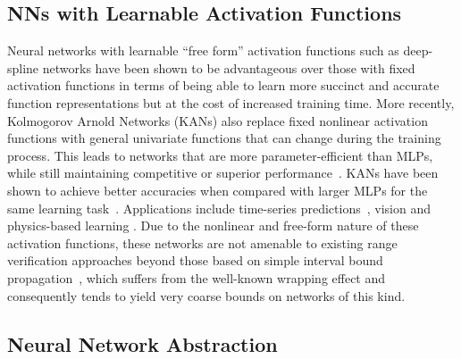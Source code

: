 \subsection{NNs with Learnable Activation Functions}

Neural networks with  learnable ``free form'' activation functions such as deep-spline networks have been shown to be advantageous over those with fixed activation functions \cite{Aziznejad+Others/2020/Deep,Pakshal+Others/2020/Learning} in terms of being able to learn more succinct and accurate function representations but at the cost of increased training time. More recently,  Kolmogorov Arnold Networks (KANs) also replace fixed nonlinear activation functions with general univariate functions that can change during the training process. This leads to networks that are more parameter-efficient than MLPs, while still maintaining competitive or superior performance~\cite{Liu+Others/2025/KAN}.  KANs have been shown to achieve better accuracies when compared with larger MLPs for the same learning task~\cite{howard_jacob_murphy_heinlein_stinis_2024,toscano_wang_karniadakis_2024}. Applications  include time-series predictions~\cite{genet2024tkan}, vision \cite{mahara2024dawn} and physics-based learning \cite{abueidda2025deepokan}. Due to the nonlinear and free-form nature of these activation functions, these networks are not amenable to existing range verification approaches beyond those based on simple interval bound propagation~\cite{moore2009introduction}, which suffers from the well-known wrapping effect and consequently tends to yield very coarse bounds on networks of this kind.

\subsection{Neural Network Abstraction}

